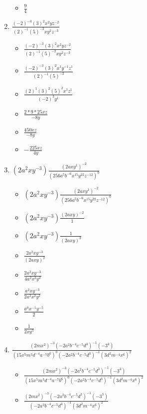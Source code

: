 \begin{enumerate}
\begin{itemize}
  \item {\Large $\frac{9}{4}$}
  \end{itemize}
\item {\Large $\frac{(-2)^{-3}(3)^{2}x^{2}yz^{-2}}{(2)^{-1}(5)^{-2}xy^{2}z^{-3}}$}
  \begin{itemize}
  \item {\Large $\frac{(-2)^{-3}(3)^{2}x^{2}yz^{-2}}{(2)^{-1}(5)^{-2}xy^{2}z^{-3}}$}
  \item {\Large $\frac{(-2)^{-3}(3)^{2}x^{1}y^{-1}z^{1}}{(2)^{-1}(5)^{-2}}$}
  \item {\Large $\frac{(2)^{1}(3)^{2}(5)^{2}x^{1}z^{1}}{(-2)^{3}y^{1}}$}
  \item {\Large $\frac{2*9*25xz}{-8y}$}
  \item {\Large $\frac{450xz}{-8y}$}
  \item {\Large $-\frac{225xz}{4y}$}
  \end{itemize}
\item {\Large $(2a^{2}xy^{-3})\frac{(2axy^{1})^{-2}}{(256a^{5}b^{-6}x^{15}y^{22}z^{-12})^{0}}$}
  \begin{itemize}
  \item {\Large $(2a^{2}xy^{-3})\frac{(2axy^{1})^{-2}}{(256a^{5}b^{-6}x^{15}y^{22}z^{-12})^{0}}$}
  \item {\Large $(2a^{2}xy^{-3})\frac{(2axy)^{-2}}{1}$}
  \item {\Large $(2a^{2}xy^{-3})\frac{1}{(2axy)^{2}}$}
  \item {\Large $\frac{2a^{2}xy^{-3}}{(2axy)^{2}}$}
  \item {\Large $\frac{2a^{2}xy^{-3}}{4a^{2}x^{2}y^{2}}$}
  \item {\Large $\frac{a^{2}xy^{-3}}{2a^{2}x^{2}y^{2}}$}
  \item {\Large $\frac{a^{0}x^{-1}y^{-5}}{2}$}
  \item {\Large $\frac{1}{2xy^{5}}$}
  \end{itemize}
\item {\Large $\frac{(2mx^{2})^{-3}(-2a^{2}b^{-4}c^{-5}d^{3})^{-1}(-3^{3})}{(15x^{5}m^{3}d^{-4}a^{-7}b^{6})^{0}(-2a^{2}b^{-4}c^{-5}d^{3})^{-1}(3d^{2}m^{-4}x^{6})^{2}}$}
  \begin{itemize}
  \item {\Large $\frac{(2mx^{2})^{-3}(-2a^{2}b^{-4}c^{-5}d^{3})^{-1}(-3^{3})}{(15x^{5}m^{3}d^{-4}a^{-7}b^{6})^{0}(-2a^{2}b^{-4}c^{-5}d^{3})^{-1}(3d^{2}m^{-4}x^{6})^{2}}$}
  \item {\Large $\frac{(2mx^{2})^{-3}(-2a^{2}b^{-4}c^{-5}d^{3})^{-1}(-3^{3})}{(-2a^{2}b^{-4}c^{-5}d^{3})^{-1}(3d^{2}m^{-4}x^{6})^{2}}$}

\end{itemize}
\end{enumerate}
